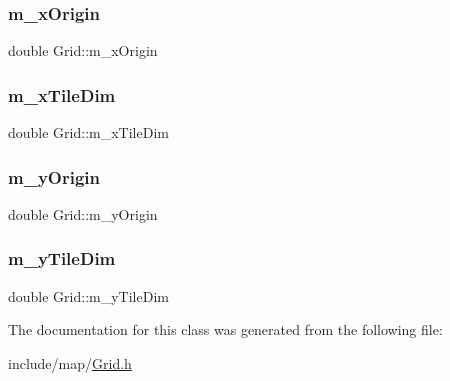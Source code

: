 \subsubsection{\texorpdfstring{m\+\_\+x\+Origin}{m\_xOrigin}}
{\footnotesize\ttfamily double Grid\+::m\+\_\+x\+Origin\hspace{0.3cm}{\ttfamily [private]}}

\mbox{\label{class_grid_a48c3d1fc34a14bff8b9176558a8b6f4e}} 
\subsubsection{\texorpdfstring{m\+\_\+x\+Tile\+Dim}{m\_xTileDim}}
{\footnotesize\ttfamily double Grid\+::m\+\_\+x\+Tile\+Dim\hspace{0.3cm}{\ttfamily [private]}}

\mbox{\label{class_grid_a16b2fc5a6e96ad2d59d59b52db83f4aa}} 
\subsubsection{\texorpdfstring{m\+\_\+y\+Origin}{m\_yOrigin}}
{\footnotesize\ttfamily double Grid\+::m\+\_\+y\+Origin\hspace{0.3cm}{\ttfamily [private]}}

\mbox{\label{class_grid_a497eeffc4a16a021e15ecbc130f4f644}} 
\subsubsection{\texorpdfstring{m\+\_\+y\+Tile\+Dim}{m\_yTileDim}}
{\footnotesize\ttfamily double Grid\+::m\+\_\+y\+Tile\+Dim\hspace{0.3cm}{\ttfamily [private]}}



The documentation for this class was generated from the following file\+:\begin{DoxyCompactItemize}
\item 
include/map/\hyperlink{_grid_8h}{Grid.\+h}\end{DoxyCompactItemize}
